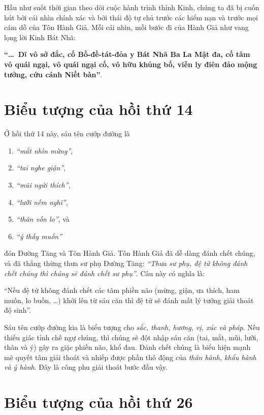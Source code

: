 Hầu như suốt thời gian theo dõi cuộc hành trình thỉnh Kinh, chúng ta đã bị cuốn hút bởi cái nhìn chính xác và bởi thái độ tự chủ trước các hiểm nạn và trước mọi cám dỗ của Tôn Hành Giả. Mỗi cái nhìn, mỗi bước đi của Hành Giả như vang lọng lời Kinh Bát Nhã:

{\bf ``\ldots ~Dĩ vô sở đắc, cố Bồ-đề-tát-đỏa y Bát Nhã Ba La Mật đa, cố tâm vô quái ngại, vô quái ngại cố, vô hữu khủng bố, viễn ly điên đảo mộng tưởng, cứu cánh Niết bàn''}.

\section{Biểu tượng của hồi thứ 14} %
\label{sec:bieu_tuong_cua_hoi_thu_14}

Ở hồi thứ 14 này, sáu tên cướp đường là
\begin{multicols}{2}
\begin{enumerate}[label=\itshape\arabic*\upshape)]
    \item \emph{``mắt nhìn mừng''},
    \item \emph{``tai nghe giận''},
    \item \emph{``mũi ngửi thích''},
    \item \emph{``lưỡi nếm nghĩ''},
    \item \emph{``thân vốn lo''}, và
    \item \emph{``ý thấy muốn''}
\end{enumerate}
\end{multicols}

đón Đường Tăng và Tôn Hành Giả. Tôn Hành Giả đã dễ dàng đánh chết chúng, và đã thẳng thừng thưa sư phụ Đường Tăng: \emph{``Thưa sư phụ, đệ tử không đánh chết chúng thì chúng sẽ đánh chết sư phụ''}. Câu này có nghĩa là:

``Nếu đệ tử không đánh chết các tâm phiền não (mừng, giận, ưa thích, ham muốn, lo buồn, \ldots) khởi lên từ sáu căn thì đệ tử sẽ đánh mất lý tưởng giải thoát độ sinh''.

Sáu tên cướp đường kia là biểu tượng cho \emph{sắc, thanh, hương, vị, xúc và pháp}. Nếu thiếu giác tỉnh chế ngự chúng, thì chúng sẽ đột nhập sáu căn (tai, mắt, mũi, lưỡi, thân và ý) gây ra giặc phiền não, khổ đau. Đánh chết chúng là biểu hiện mạnh mẽ quyết tâm giải thoát và nhiếp được phần thô động của \emph{thân hành, khẩu hành và ý hành}. Đây là công phu giải thoát bước đầu vậy.

\section{Biểu tượng của hồi thứ 26} %
\label{sec:bieu_tuong_cua_hoi_thu_26}

